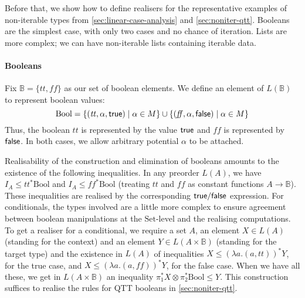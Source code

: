 \documentclass[acmsmall,screen]{acmart}
\newcommand{\Set}{\mathrm{Set}}
\begin{document}
Before that, we show how to define realisers for the representative
examples of non-iterable types from \autoref{sec:linear-case-analysis}
and \autoref{sec:noniter-qtt}. Booleans are the simplest case, with
only two cases and no chance of iteration. Lists are more complex; we
can have non-iterable lists containing iterable data.

\paragraph{Booleans} Fix $\mathbb{B} = \{ \mathit{tt}, \mathit{ff} \}$
as our set of boolean elements. We define an element of
$L(\mathbb{B})$ to represent boolean values:
\begin{displaymath}
  \mathrm{Bool} = \{ (\mathit{tt}, \alpha, \mathsf{true}) \mid \alpha \in M \} \cup \{ (\mathit{ff}, \alpha, \mathsf{false}) \mid \alpha \in M \}
\end{displaymath}
Thus, the boolean $\mathit{tt}$ is represented by the value $\mathsf{true}$
and $\mathit{ff}$ is represented by $\mathsf{false}$. In both cases, we
allow arbitrary potential $\alpha$ to be attached.

Realisability of the construction and elimination of booleans amounts
to the existence of the following inequalities. In any preorder
$L(A)$, we have $I_A \leq \mathit{tt}^* \mathrm{Bool}$ and
$I_A \leq \mathit{ff}^* \mathrm{Bool}$ (treating $\mathit{tt}$ and
$\mathit{ff}$ as constant functions $A \to \mathbb{B}$). These
inequalities are realised by the corresponding $\mathsf{true}/\mathsf{false}$
expression. For conditionals, the types involved are a little more
complex to ensure agreement between boolean manipulations at the
$\Set$-level and the realising computations. To get a realiser for a
conditional, we require a set $A$, an element $X \in L(A)$ (standing for
the context) and an element $Y \in L(A \times \mathbb{B})$ (standing
for the target type) and the existence in $L(A)$ of inequalities
$X \leq (\lambda a. (a, \mathit{tt}))^* Y$, for the true case, and
$X \leq (\lambda a. (a, \mathit{ff}))^* Y$, for the false case. When
we have all these, we get in $L(A \times \mathbb{B})$ an inequality
$\pi_1^* X \otimes \pi_2^* \mathrm{Bool} \leq Y$. This construction
suffices to realise the rules for QTT booleans in
\autoref{sec:noniter-qtt}.
\end{document}
